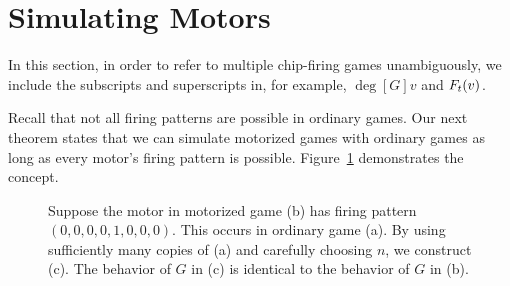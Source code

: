 \section{Simulating Motors} \label{simulatingMotors}
\showgame

In this section, in order to refer to multiple chip-firing games unambiguously,
we include the subscripts and superscripts in, for example, $\deg[G]{v}$ and
$\firing{v}{t}$.

Recall that not all firing patterns are possible in ordinary games.
Our next theorem states that we can simulate motorized games
with ordinary games as long as every motor's firing pattern is
possible. Figure~\ref{natMot} demonstrates the concept.

\begin{centering}
\begin{figure}[tbh]
  \caption{Suppose the motor in motorized game (b) has firing pattern
    $(0,0,0,0,1,0,0,0)$. This occurs in ordinary game (a). By using
    sufficiently many copies of (a) and carefully choosing $n$, we construct
    (c). The behavior of $G$ in (c) is identical to the behavior of $G$ in
    (b).}
\label{natMot}
\end{figure}
\end{centering}

